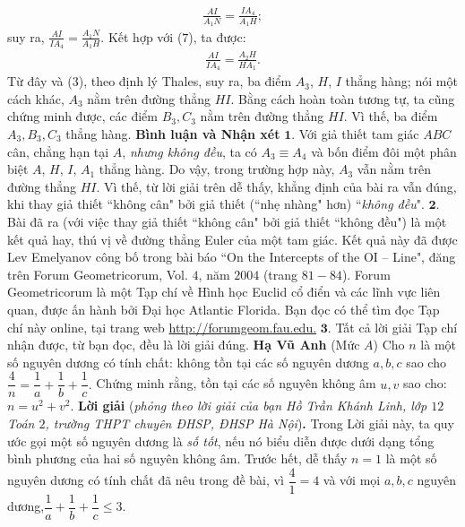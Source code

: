 \begin{multicols}{2}
\begin{align*}
		\frac{{AI}}{{{A_1}N}} = \frac{{I{A_4}}}{{{A_1}H}};
	\end{align*}
	suy ra,  $\frac{{AI}}{{I{A_4}}} = \frac{{{A_1}N}}{{{A_1}H}}$. Kết hợp với ($7$), ta được:
	\begin{align*}
		\frac{{AI}}{{I{A_4}}} = \frac{{{A_2}H}}{{H{A_1}}}.
	\end{align*}
	Từ đây và ($3$), theo định lý Thales, suy ra, ba điểm  $A_3$, $H$, $I$ thẳng hàng; nói một cách khác, $A_3$  nằm trên đường thẳng $HI$.
	\vskip 0.05cm
	Bằng cách hoàn toàn tương tự, ta cũng chứng minh được, các điểm $B_3, C_3$  nằm trên đường thẳng $HI$. Vì thế, ba điểm  $A_3, B_3 ,C_3$  thẳng hàng.
	\vskip 0.05cm
	\textbf{\color{thachthuctoanhoc}Bình luận và Nhận xét}
	\vskip 0.05cm
	$\pmb{1.}$ Với giả thiết tam giác $ABC$ cân, chẳng hạn tại $A$, \textit{nhưng không đều}, ta có  $A_3 \equiv A_4$ và bốn điểm đôi một phân biệt $A$, $H$, $I$, $A_1$  thẳng hàng. Do vậy, trong trường hợp này,  $A_3$ vẫn nằm trên đường thẳng $HI$. Vì thế, từ lời giải trên dễ thấy, khẳng định của bài ra vẫn đúng, khi thay giả thiết ``không cân" bởi giả thiết (``nhẹ nhàng" hơn) ``\textit{không đều}".
	\vskip 0.05cm
	$\pmb{2.}$ Bài đã ra (với việc thay giả thiết ``không cân" bởi giả thiết ``không đều") là một kết quả hay, thú vị về đường thẳng Euler của một tam giác. Kết quả này đã được Lev Emelyanov công bố trong bài báo ``On the Intercepts of the OI -- Line", đăng trên Forum Geometricorum, Vol. $4$, năm $2004$ (trang $81 - 84$).
	Forum Geometricorum là một Tạp chí về Hình học Euclid cổ điển và các lĩnh vực liên quan, được ấn hành bởi Đại học Atlantic Florida. Bạn đọc có thể tìm đọc Tạp chí này online, tại trang web \url{http://forumgeom.fau.edu.}
	\vskip 0.05cm
	$\pmb{3.}$ Tất cả lời giải Tạp chí nhận được, từ bạn đọc, đều là lời giải đúng.
	\vskip 0.05cm
	\hfill	\textbf{\color{thachthuctoanhoc}Hạ Vũ Anh}
	\vskip 0.05cm
	{}
	(Mức $A$) Cho $n$ là một số nguyên dương có tính chất: không tồn tại các số nguyên dương $a,b,c$ sao cho $\dfrac4n=\dfrac 1a+\dfrac 1b+\dfrac 1c.$ Chứng minh rằng, tồn tại các số nguyên không âm $u,v$ sao cho: $n=u^2+v^2$.  
	\vskip 0.05cm
	\textbf{\color{thachthuctoanhoc}Lời giải} (\textit{phỏng theo lời giải của bạn Hồ Trần Khánh Linh, lớp $12$ Toán $2$, trường THPT chuyên ĐHSP, ĐHSP Hà Nội})\textbf{\color{thachthuctoanhoc}.}
	\vskip 0.05cm
	Trong Lời giải này, ta quy ước gọi một số nguyên dương là \textit{số tốt}, nếu nó biểu diễn được dưới dạng tổng bình phương của hai số nguyên không âm.
	\vskip 0.05cm
	Trước hết, dễ thấy $n = 1$ là một số nguyên dương có tính chất đã nêu trong đề bài, vì $\dfrac{4}{1} = 4$ và với mọi $a, b, c$ nguyên dương,\linebreak $\dfrac{1}{a} + \dfrac{1}{b} + \dfrac{1}{c} \le 3$.

\end{multicols}
